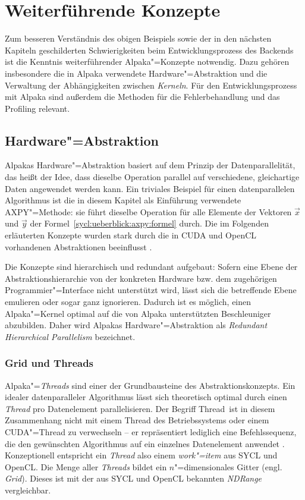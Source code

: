 \section{Weiterführende Konzepte}\label{alpaka:konzepte}

Zum besseren Verständnis des obigen Beispiels sowie der in den nächsten Kapiteln
geschilderten Schwierigkeiten beim Entwicklungsprozess des Backends ist die
Kenntnis weiterführender Alpaka"=Konzepte notwendig. Dazu gehören insbesondere
die in Alpaka verwendete Hardware"=Abstraktion und die Verwaltung der
Abhängigkeiten zwischen \textit{Kerneln}. Für den Entwicklungsprozess mit Alpaka sind
außerdem die Methoden für die Fehlerbehandlung und das Profiling relevant.

\subsection{Hardware"=Abstraktion}
\label{alpaka:konzepte:abstraktion}

Alpakas Hardware"=Abstraktion basiert auf dem Prinzip der Datenparallelität, das
heißt der Idee, dass dieselbe Operation parallel auf verschiedene, gleichartige
Daten angewendet werden kann. Ein triviales Beispiel für einen datenparallelen
Algorithmus ist die in diesem Kapitel als Einführung verwendete AXPY"=Methode:
sie führt dieselbe Operation für alle Elemente der Vektoren $\vec{x}$ und
$\vec{y}$ der Formel~\ref{sycl:ueberblick:axpy:formel} durch. Die im Folgenden
erläuterten Konzepte wurden stark durch die in CUDA und OpenCL vorhandenen
Abstraktionen beeinflusst \cite[vgl.][17]{worpitz2015}.

Die Konzepte sind hierarchisch und redundant aufgebaut: Sofern eine Ebene der
Abstraktionshierarchie von der konkreten Hardware bzw. dem zugehörigen
Programmier"=Interface nicht unterstützt wird, lässt sich die betreffende Ebene
emulieren oder sogar ganz ignorieren. Dadurch ist es möglich, einen
Alpaka"=Kernel optimal auf die von Alpaka unterstützten Beschleuniger
abzubilden. Daher wird Alpakas Hardware"=Abstraktion als \textit{Redundant
Hierarchical Parallelism} bezeichnet. \cite[vgl.][22]{worpitz2015}

\subsubsection{Grid und Threads}

Alpaka"=\textit{Threads} sind einer der Grundbausteine des Abstraktionskonzepts.
Ein idealer datenparalleler Algorithmus lässt sich theoretisch optimal durch
einen \textit{Thread} pro Datenelement parallelisieren. Der Begriff
\glqq Thread\grqq\ ist in diesem Zusammenhang nicht mit einem Thread des
Betriebssystems oder einem CUDA"=Thread zu verwechseln -- er repräsentiert
lediglich eine Befehlssequenz, die den gewünschten Algorithmus auf ein einzelnes
Datenelement anwendet \cite[vgl.][17]{worpitz2015}. Konzeptionell entspricht
ein \textit{Thread} also einem \textit{work"=item} aus SYCL und OpenCL. Die
Menge aller \textit{Threads} bildet ein $n$"=dimensionales Gitter
(engl. \textit{Grid}). Dieses ist mit der aus SYCL und OpenCL bekannten
\textit{NDRange} vergleichbar.

